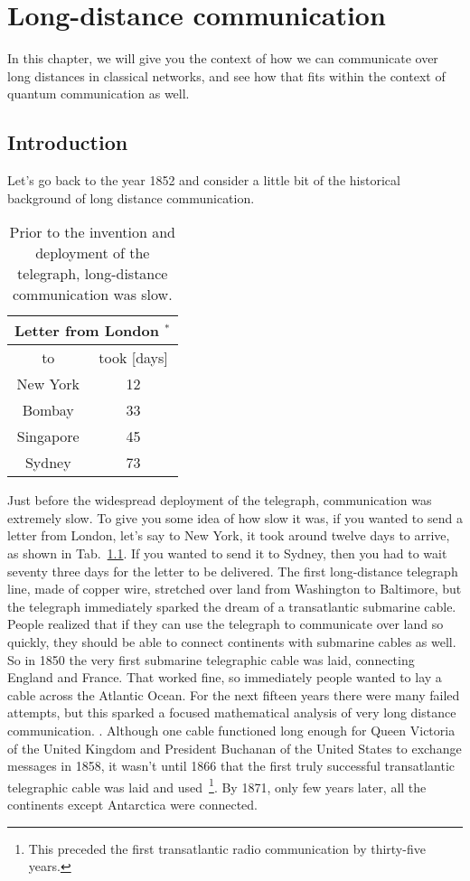 \chapter{Long-distance communication}
\label{sec:11_long-distance}

In this chapter, we will give you the context of how we can communicate over long distances in classical networks, and see how that fits within the context of quantum communication as well.

\section{Introduction}
\label{sec:ld-intro}


Let's go back to the year 1852 and consider a little bit of the historical background of long distance communication.

\begin{table}
\begin{tabular}{|c|c|}
\hline \multicolumn{2}{|c|}{ Letter from London ${ }^*$} \\
\hline to & took [days] \\
\hline New York & 12 \\
Bombay & 33 \\
Singapore & 45 \\
Sydney & 73 \\
\hline
\end{tabular}
\caption{Prior to the invention and deployment of the telegraph, long-distance communication was slow.}
\label{tab:london-letter}
\end{table}

Just before the widespread deployment of the telegraph, communication was extremely slow. To give you some idea of how slow it was, if you wanted to send a letter from London, let's say to New York, it took around twelve days to arrive, as shown in Tab.~\ref{tab:london-letter}. If you wanted to send it to Sydney, then you had to wait seventy three days for the letter to be delivered. The first long-distance telegraph line, made of copper wire, stretched over land from Washington to Baltimore, but the telegraph immediately sparked the dream of a transatlantic submarine cable. People realized that if they can use the telegraph to communicate over land so quickly, they should be able to connect continents with submarine cables as well. So in 1850 the very first submarine telegraphic cable was laid, connecting England and France. That worked fine, so immediately people wanted to lay a cable across the Atlantic Ocean. For the next fifteen years there were many failed attempts, but this sparked a focused mathematical analysis of very long distance communication. . Although one cable functioned long enough for Queen Victoria of the United Kingdom and President Buchanan of the United States to exchange messages in 1858, it wasn't until 1866 that the first truly successful transatlantic telegraphic cable was laid and used~\footnote{This preceded the first transatlantic radio communication by thirty-five years.}. By 1871, only few years later, all the continents except Antarctica were connected.

